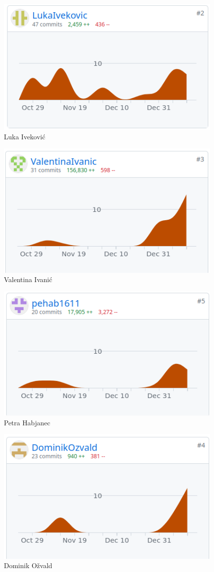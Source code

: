 		\begin{figure}[H]
			\includegraphics[scale=0.45]{slike/luka_git.png} 
			\centering
			\caption{Luka Iveković}
			\label{fig:id1}
		\end{figure}
		\begin{figure}[H]
			\includegraphics[scale=0.45]{slike/valentina_git.png} 
			\centering
			\caption{Valentina Ivanić}
			\label{fig:id2}
		\end{figure}
		\begin{figure}[H]
			\includegraphics[scale=0.45]{slike/petra_git.png} 
			\centering
			\caption{Petra Habjanec}
			\label{fig:id3}
		\end{figure}
		\begin{figure}[H]
			\includegraphics[scale=0.45]{slike/dominik_git.png} 
			\centering
			\caption{Dominik Ožvald}
			\label{fig:id4}
		\end{figure}